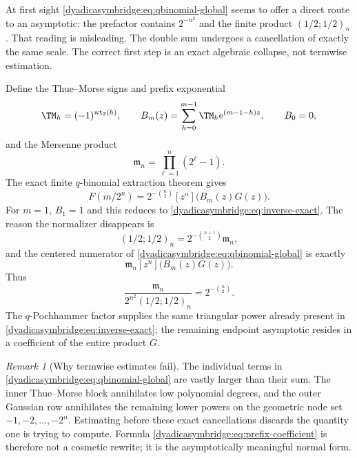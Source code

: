\documentclass[11pt,oneside]{article}
\theoremstyle{definition}
\theoremstyle{remark}
\newtheorem{remark}[theorem]{Remark}
\newcommand{\wt}{\operatorname{wt}_2}
\newcommand{\e}{\mathrm e}
\begin{document}
At first sight \eqref{dyadicasymbridge:eq:qbinomial-global} seems to offer a direct route to an asymptotic: the prefactor contains $2^{-n^2}$ and the finite product
$(1/2;1/2)_n$.  That reading is misleading.  The double sum undergoes a cancellation of exactly the same scale.  The correct first step is an exact algebraic collapse, not termwise estimation.

Define the Thue--Morse signs and prefix exponential
\begin{equation}
 \TM_h=(-1)^{\wt(h)},
 \qquad
 B_m(z)=\sum_{h=0}^{m-1}\TM_h\e^{(m-1-h)z},
 \qquad B_0=0,
\label{dyadicasymbridge:eq:Bm-def}
\end{equation}
and the Mersenne product
\begin{equation}
 \mathfrak m_n=\prod_{\ell=1}^n(2^\ell-1).
\label{dyadicasymbridge:eq:mersenne-product}
\end{equation}
The exact finite $q$-binomial extraction theorem gives
\begin{equation}
 \boxed{
 F(m/2^n)=2^{-\binom n2}[z^n]\bigl(B_m(z)G(z)\bigr).}
\label{dyadicasymbridge:eq:prefix-coefficient}
\end{equation}
For $m=1$, $B_1=1$ and this reduces to \eqref{dyadicasymbridge:eq:inverse-exact}.  The reason the normalizer disappears is
\begin{equation}
 (1/2;1/2)_n=2^{-\binom{n+1}{2}}\mathfrak m_n,
\label{dyadicasymbridge:eq:q-mersenne}
\end{equation}
and the centered numerator of \eqref{dyadicasymbridge:eq:qbinomial-global} is exactly
\begin{equation}
 \mathfrak m_n[z^n]\bigl(B_m(z)G(z)\bigr).
\label{dyadicasymbridge:eq:q-numerator-collapse}
\end{equation}
Thus
\begin{equation}
 \frac{\mathfrak m_n}{2^{n^2}(1/2;1/2)_n}
 =2^{-\binom n2}.
\label{dyadicasymbridge:eq:q-normalizer-cancel}
\end{equation}
The $q$-Pochhammer factor supplies the same triangular power already present in
\eqref{dyadicasymbridge:eq:inverse-exact}; the remaining endpoint asymptotic resides in a coefficient of the entire product $G$.

\begin{remark}[Why termwise estimates fail]
The individual terms in \eqref{dyadicasymbridge:eq:qbinomial-global} are vastly larger than their sum.  The inner Thue--Morse block annihilates low polynomial degrees, and the outer Gaussian row annihilates the remaining lower powers on the geometric node set $-1,-2,\ldots,-2^n$.  Estimating before these exact cancellations discards the quantity one is trying to compute.  Formula \eqref{dyadicasymbridge:eq:prefix-coefficient} is therefore not a cosmetic rewrite; it is the asymptotically meaningful normal form.
\end{remark}
\end{document}
